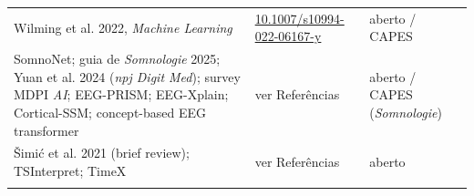\documentclass[11pt,a4paper]{article}
\begin{document}
{\begin{xltabular}{\linewidth}{>{\raggedright\arraybackslash}X>{\raggedright\arraybackslash}X>{\raggedright\arraybackslash}X}
Wilming et al. 2022, \textit{Machine Learning} & \href{https://arxiv.org/abs/2111.07473v2}{10.1007/s10994-022-06167-y} & aberto / CAPES \\ \addlinespace[1pt]
SomnoNet; guia de \textit{Somnologie} 2025; Yuan et al. 2024 (\textit{npj Digit Med}); survey MDPI \textit{AI}; EEG-PRISM; EEG-Xplain; Cortical-SSM; concept-based EEG transformer & ver Referências & aberto / CAPES (\textit{Somnologie}) \\ \addlinespace[1pt]
Šimić et al. 2021 (brief review); TSInterpret; TimeX & ver Referências & aberto \\ \addlinespace[1pt]
\bottomrule
\end{xltabular}}
\end{document}
